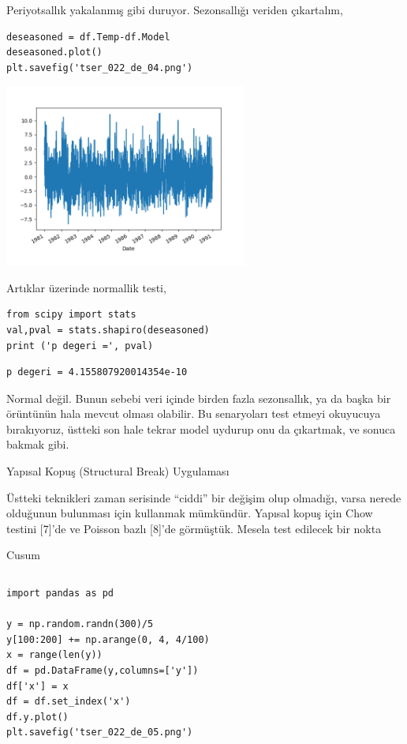 \documentclass[12pt,fleqn]{article}\usepackage{../../common}
\begin{document}
Periyotsallık yakalanmış gibi duruyor. Sezonsallığı veriden çıkartalım,

\begin{verbatim}
deseasoned = df.Temp-df.Model
deseasoned.plot()
plt.savefig('tser_022_de_04.png')
\end{verbatim}

\includegraphics[height=6cm]{tser_022_de_04.png}

Artıklar üzerinde normallik testi,

\begin{verbatim}
from scipy import stats
val,pval = stats.shapiro(deseasoned)
print ('p degeri =', pval)
\end{verbatim}

\begin{verbatim}
p degeri = 4.155807920014354e-10
\end{verbatim}

Normal değil. Bunun sebebi veri içinde birden fazla sezonsallık, ya da başka bir
örüntünün hala mevcut olması olabilir. Bu senaryoları test etmeyi okuyucuya
bırakıyoruz, üstteki son hale tekrar model uydurup onu da çıkartmak, ve sonuca
bakmak gibi.

Yapısal Kopuş (Structural Break) Uygulaması

Üstteki teknikleri zaman serisinde ``ciddi'' bir değişim olup olmadığı, varsa
nerede olduğunun bulunması için kullanmak mümkündür. Yapısal kopuş için Chow
testini [7]'de ve Poisson bazlı [8]'de görmüştük. Mesela test edilecek bir nokta


Cusum

\inputminted[fontsize=\footnotesize]{python}{cusum.py}

\begin{verbatim}
import pandas as pd
  
y = np.random.randn(300)/5
y[100:200] += np.arange(0, 4, 4/100)
x = range(len(y))
df = pd.DataFrame(y,columns=['y'])
df['x'] = x
df = df.set_index('x')
df.y.plot()
plt.savefig('tser_022_de_05.png')
\end{verbatim}
\end{document}
